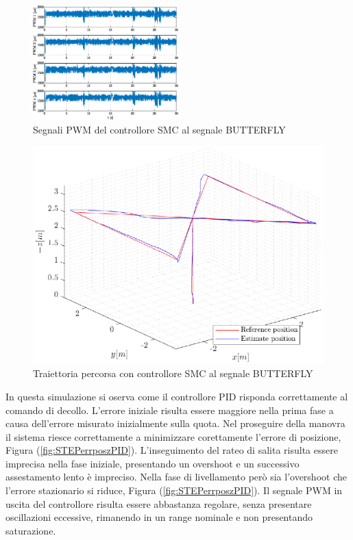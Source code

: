 \begin{figure}
	\centering
	\includegraphics[width=0.5\textwidth]{Simulazioni/Figure/SMC/BUTTERFLY/PWM}
	\caption{Segnali PWM del controllore SMC al segnale BUTTERFLY}
	\label{fig:BUTTERFLYPWMSMC}
\end{figure}
\begin{figure}
	\centering
	\includegraphics[width=1\textwidth]{Simulazioni/Figure/SMC/BUTTERFLY/Trajectory}
	\caption{Traiettoria percorsa con controllore SMC al segnale BUTTERFLY}
	\label{fig:BUTTERFLYtraSMC}
\end{figure}

In questa simulazione si oserva come il controllore PID risponda correttamente al comando di decollo. L'errore iniziale risulta essere maggiore nella prima fase a causa dell'errore misurato inizialmente sulla quota. Nel proseguire della manovra il sistema riesce correttamente a minimizzare corettamente l'errore di posizione, Figura (\ref{fig:STEPerrposzPID}). L'inseguimento del rateo di salita risulta essere imprecisa nella fase iniziale, presentando un overshoot e un successivo assestamento lento è impreciso. Nella fase di livellamento però sia l'overshoot che l'errore stazionario si riduce, Figura (\ref{fig:STEPerrposzPID}). Il segnale PWM in uscita del controllore risulta essere abbastanza regolare, senza presentare oscillazioni eccessive, rimanendo in un range nominale e non presentando saturazione.

